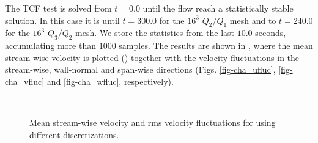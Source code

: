 The TCF test is solved from $ t=0.0 $ until the flow reach a statistically stable solution. In this case it is until $ t=300.0 $ for the $ 16^3 $ $ Q_2/Q_1 $ mesh and to $ t=240.0 $ for the $ 16^3 $ $ Q_3/Q_2 $ mesh. We store the statistics from the last $ 10.0 $ seconds, accumulating more than $ 1000 $ samples. The results are shown in , where the mean stream-wise velocity is plotted () together with the velocity fluctuations in the stream-wise, wall-normal and span-wise directions (Figs. \ref{fig-cha_ufluc}, \ref{fig-cha_vfluc} and \ref{fig-cha_wfluc}, respectively).
\begin{figure}[h!]
	\centering	
	\\   
	\caption{Mean stream-wise velocity and rms velocity fluctuations for using different discretizations.}
	\label{fig-cha_vel}
\end{figure}

